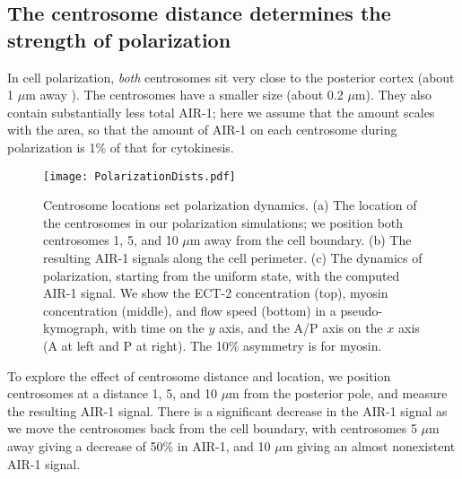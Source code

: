 \documentclass[11pt]{article}
\newcommand{\red}[1]{\color{red}#1\normalcolor}
\begin{document}
\subsection{The centrosome distance determines the strength of polarization \label{sec:airpol}}
In cell polarization, \emph{both} centrosomes sit very close to the posterior cortex (about 1 $\mu$m away \citep{cowan2004centrosomes}). The centrosomes have a smaller size (about 0.2 $\mu$m). They also contain substantially less total AIR-1; here we assume that the amount scales with the area, so that the amount of AIR-1 on each centrosome during polarization is 1\% of that for cytokinesis. 

\begin{figure}
\centering
\texttt{[image: PolarizationDists.pdf]}
\caption{\label{fig:PolLoc}Centrosome locations set polarization dynamics. (a) The location of the centrosomes in our polarization simulations; we position both centrosomes 1, 5, and 10 $\mu$m away from the cell boundary. (b) The resulting AIR-1 signals along the cell perimeter. (c) The dynamics of polarization, starting from the uniform state, with the computed AIR-1 signal. We show the ECT-2 concentration (top), myosin concentration (middle), and flow speed (bottom) in a pseudo-kymograph, with time on the $y$ axis, and the A/P axis on the $x$ axis (A at left and P at right). \red{The 10\% asymmetry is for myosin.}}
\end{figure}

To explore the effect of centrosome distance and location, we position centrosomes at a distance 1, 5, and 10 $\mu$m from the posterior pole, and measure the resulting AIR-1 signal. There is a significant decrease in the AIR-1 signal as we move the centrosomes back from the cell boundary, with centrosomes 5 $\mu$m away giving a decrease of 50\% in AIR-1, and 10 $\mu$m giving an almost nonexistent AIR-1 signal.
\end{document}

